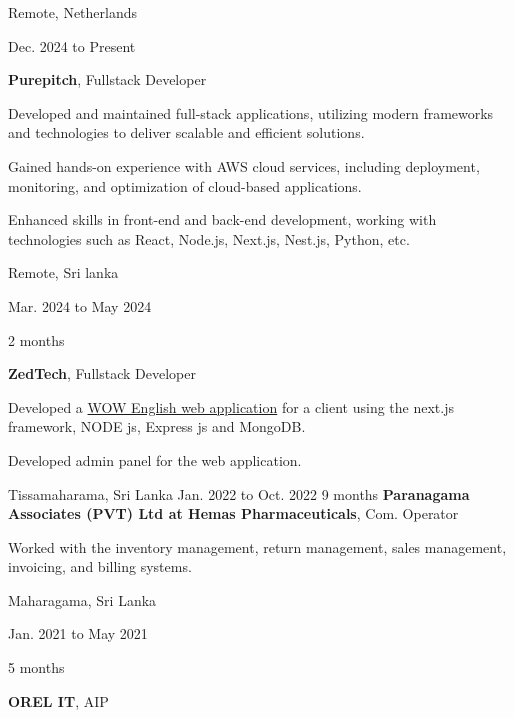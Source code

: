 
\begin{twocolentry}{
      Remote, Netherlands

      Dec. 2024 to Present

   }
   \textbf{Purepitch}, Fullstack Developer
   \begin{highlights}
      \item Developed and maintained full-stack applications, utilizing modern frameworks and technologies to deliver scalable and efficient solutions.
      \item Gained hands-on experience with AWS cloud services, including deployment, monitoring, and optimization of cloud-based applications.
      \item Enhanced skills in front-end and back-end development, working with technologies such as React, Node.js, Next.js, Nest.js, Python, etc.
   \end{highlights}
\end{twocolentry}

\vspace{0.2 cm}

\begin{twocolentry}{
      Remote, Sri lanka

      Mar. 2024 to May 2024

      2 months
   }
   \textbf{ZedTech}, Fullstack Developer
   \begin{highlights}
      \item Developed a \href{https://wowenglish.lk}{WOW English web application} for a client using the next.js framework, NODE js, Express js and MongoDB.
      \item Developed admin panel for the web application.
   \end{highlights}
\end{twocolentry}

\vspace{0.2 cm}

\begin{twocolentry}{
      Tissamaharama, Sri Lanka Jan. 2022 to Oct. 2022
      9 months
   }
   \textbf{Paranagama Associates (PVT) Ltd at Hemas Pharmaceuticals}, Com. Operator \begin{highlights}
      \item Worked with the inventory management, return management, sales management, invoicing, and billing systems.
   \end{highlights}
\end{twocolentry}


\vspace{0.2 cm}

\begin{twocolentry}{
      Maharagama, Sri Lanka

      Jan. 2021 to May 2021

      5 months
   }
   \textbf{OREL IT}, AIP
\end{twocolentry}